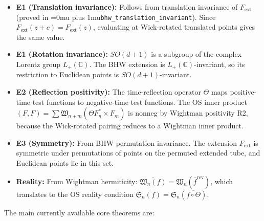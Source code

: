 \documentclass[11pt,a4paper]{article}
\newcommand{\leanname}[1]{\begingroup\Urlmuskip=0mu plus 1mu\relax\nolinkurl{#1}\endgroup}
\begin{document}
\begin{itemize}
\item \textbf{E1 (Translation invariance):} Follows from translation invariance
  of $F_{\mathrm{ext}}$ (proved in \leanname{bhw\_translation\_invariant}).
  Since $F_{\mathrm{ext}}(z + c) = F_{\mathrm{ext}}(z)$, evaluating at
  Wick-rotated translated points gives the same value.

\item \textbf{E1 (Rotation invariance):} $SO(d{+}1)$ is a subgroup of the
  complex Lorentz group $L_+(\mathbb{C})$. The BHW extension is $L_+(\mathbb{C})$-invariant,
  so its restriction to Euclidean points is $SO(d{+}1)$-invariant.

\item \textbf{E2 (Reflection positivity):} The time-reflection operator $\Theta$
  maps positive-time test functions to negative-time test functions. The
  OS inner product $(F, F) = \sum \mathfrak{W}_{n+m}(\Theta F_n^* \times F_m)$
  is nonneg by Wightman positivity R2, because the Wick-rotated pairing
  reduces to a Wightman inner product.

\item \textbf{E3 (Symmetry):} From BHW permutation invariance. The extension
  $F_{\mathrm{ext}}$ is symmetric under permutations of points on the permuted
  extended tube, and Euclidean points lie in this set.

\item \textbf{Reality:} From Wightman hermiticity: $\overline{\mathfrak{W}_n(f)} =
  \mathfrak{W}_n(\bar{f}^{\mathrm{rev}})$, which translates to the OS reality
  condition $\overline{\mathfrak{S}_n(f)} = \mathfrak{S}_n(\overline{f \circ \Theta})$.
\end{itemize}

The main currently available core theorems are:
\end{document}
